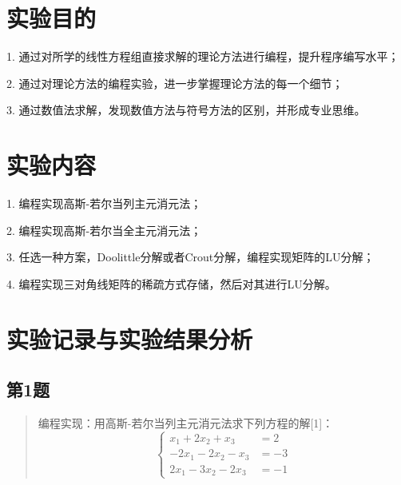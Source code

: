 









\newcommand{\ThisProjectTitle}{线性方程组的直接解法}
\newcommand{\ThisDate}{2017年10月16日}
\newcommand{\ThisNo}{No.1}



\section{实验目的}

1. 通过对所学的线性方程组直接求解的理论方法进行编程，提升程序编写水平；

2. 通过对理论方法的编程实验，进一步掌握理论方法的每一个细节；

3. 通过数值法求解，发现数值方法与符号方法的区别，并形成专业思维。

\section{实验内容}

1. 编程实现高斯-若尔当列主元消元法；

2. 编程实现高斯-若尔当全主元消元法；

3. 任选一种方案，Doolittle分解或者Crout分解，编程实现矩阵的LU分解；

4. 编程实现三对角线矩阵的稀疏方式存储，然后对其进行LU分解。



\section{实验记录与实验结果分析}

\subsection{第1题}
\begin{quote}
    {\kaishu
        编程实现：用高斯-若尔当列主元消元法求下列方程的解[1]：
    }
    \begin{equation}
        \left\{\begin{aligned}
            x_{1}+2 x_{2}+x_{3}     &=  2   \\
            -2 x_{1}-2 x_{2}-x_{3}  &=  -3  \\
            2 x_{1}-3 x_{2}-2 x_{3} &=  -1 
        \end{aligned}\right.
    \end{equation}
\end{quote}

